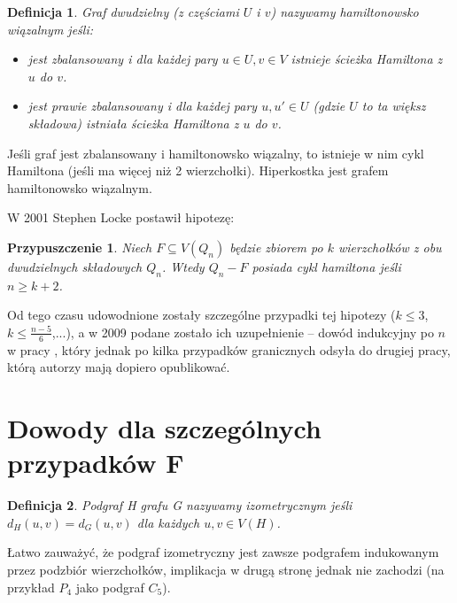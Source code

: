 \documentclass{pracamgr}
\newtheorem{defi}{Definicja}[section] %
\newtheorem{conjecture}{Przypuszczenie}
\begin{document}
   \begin{defi}\label{Hamiltonian lacable}%
    Graf dwudzielny (z częściami $U$ i $v$) nazywamy hamiltonowsko wiązalnym jeśli:
    \begin{itemize}
     \item jest zbalansowany i dla każdej pary $u\in U,v\in V$ istnieje ścieżka Hamiltona z $u$ do $v$.
     \item jest prawie zbalansowany i dla każdej pary $u,u'\in U$ (gdzie $U$ to ta większ składowa) istniała ścieżka Hamiltona
      z $u$ do $v$.
    \end{itemize}
   \end{defi}
   Jeśli graf jest zbalansowany i hamiltonowsko wiązalny, to istnieje w nim cykl Hamiltona (jeśli ma więcej niż 2 wierzchołki).\newline
   Hiperkostka jest grafem hamiltonowsko wiązalnym.\newline

   W 2001 Stephen Locke postawił hipotezę:
   \begin{conjecture}\label{Locke conjecture}
    Niech $F\subseteq V(Q_n)$ będzie zbiorem po $k$ wierzchołków z obu dwudzielnych składowych $Q_n$. Wtedy $Q_n-F$ posiada cykl hamiltona jeśli
    $n\ge k+2$.
   \end{conjecture}
   Od tego czasu udowodnione zostały szczególne przypadki tej hipotezy ($k\le3$, $k\le\frac{n-5}{6}$,...),
   a w 2009 podane zostało ich uzupełnienie -- dowód indukcyjny po $n$ w pracy \cite{Locke}, który jednak po kilka przypadków granicznych odsyła
   do drugiej pracy, którą autorzy mają dopiero opublikować.
   
  \section{Dowody dla szczególnych przypadków F}
   \begin{defi}\label{podgraf izometryczny}
    Podgraf H grafu G nazywamy \emph{izometrycznym} jeśli $d_H(u,v)=d_G(u,v)$ dla każdych $u,v\in V(H)$.
   \end{defi}
   Łatwo zauważyć, że podgraf izometryczny jest zawsze podgrafem indukowanym przez podzbiór wierzchołków,
   implikacja w drugą stronę jednak nie zachodzi (na przykład $P_4$ jako podgraf $C_5$).
\end{document}

